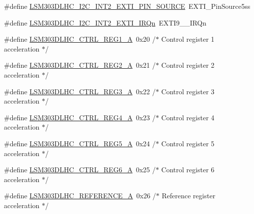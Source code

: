 \begin{DoxyCompactItemize}
\item 
\#define \hyperlink{group__STM32F3__DISCOVERY__LSM303DLHC__Exported__Constants_ga3d4f1652209c1dbafc08a72a7cbb7303}{L\+S\+M303\+D\+L\+H\+C\+\_\+\+I2\+C\+\_\+\+I\+N\+T2\+\_\+\+E\+X\+T\+I\+\_\+\+P\+I\+N\+\_\+\+S\+O\+U\+R\+C\+E}~E\+X\+T\+I\+\_\+\+Pin\+Source5ss
\item 
\#define \hyperlink{group__STM32F3__DISCOVERY__LSM303DLHC__Exported__Constants_ga75b6ab959e8f89af299bd4923390b97c}{L\+S\+M303\+D\+L\+H\+C\+\_\+\+I2\+C\+\_\+\+I\+N\+T2\+\_\+\+E\+X\+T\+I\+\_\+\+I\+R\+Qn}~E\+X\+T\+I9\+\_\+\_\+\+I\+R\+Qn
\item 
\#define \hyperlink{group__STM32F3__DISCOVERY__LSM303DLHC__Exported__Constants_ga87326dd8e8f0fe74b1689b8365312830}{L\+S\+M303\+D\+L\+H\+C\+\_\+\+C\+T\+R\+L\+\_\+\+R\+E\+G1\+\_\+\+A}~0x20  /$\ast$ Control register 1 acceleration $\ast$/
\item 
\#define \hyperlink{group__STM32F3__DISCOVERY__LSM303DLHC__Exported__Constants_ga2eff26528906665bbf697088071050fd}{L\+S\+M303\+D\+L\+H\+C\+\_\+\+C\+T\+R\+L\+\_\+\+R\+E\+G2\+\_\+\+A}~0x21  /$\ast$ Control register 2 acceleration $\ast$/
\item 
\#define \hyperlink{group__STM32F3__DISCOVERY__LSM303DLHC__Exported__Constants_ga1e9414a7b510739f57df1fb3c710d22b}{L\+S\+M303\+D\+L\+H\+C\+\_\+\+C\+T\+R\+L\+\_\+\+R\+E\+G3\+\_\+\+A}~0x22  /$\ast$ Control register 3 acceleration $\ast$/
\item 
\#define \hyperlink{group__STM32F3__DISCOVERY__LSM303DLHC__Exported__Constants_ga2c3eac75170d7de212b51aef83e77641}{L\+S\+M303\+D\+L\+H\+C\+\_\+\+C\+T\+R\+L\+\_\+\+R\+E\+G4\+\_\+\+A}~0x23  /$\ast$ Control register 4 acceleration $\ast$/
\item 
\#define \hyperlink{group__STM32F3__DISCOVERY__LSM303DLHC__Exported__Constants_ga913abcd3b4dab0f9197d5132bca46a10}{L\+S\+M303\+D\+L\+H\+C\+\_\+\+C\+T\+R\+L\+\_\+\+R\+E\+G5\+\_\+\+A}~0x24  /$\ast$ Control register 5 acceleration $\ast$/
\item 
\#define \hyperlink{group__STM32F3__DISCOVERY__LSM303DLHC__Exported__Constants_gad009fd6bc177ecef1d1824036a8337df}{L\+S\+M303\+D\+L\+H\+C\+\_\+\+C\+T\+R\+L\+\_\+\+R\+E\+G6\+\_\+\+A}~0x25  /$\ast$ Control register 6 acceleration $\ast$/
\item 
\#define \hyperlink{group__STM32F3__DISCOVERY__LSM303DLHC__Exported__Constants_gafa09cdbe24fc3ab09d2f2f3d02e14b4f}{L\+S\+M303\+D\+L\+H\+C\+\_\+\+R\+E\+F\+E\+R\+E\+N\+C\+E\+\_\+\+A}~0x26  /$\ast$ Reference register acceleration $\ast$/
\item 

\end{DoxyCompactItemize}
